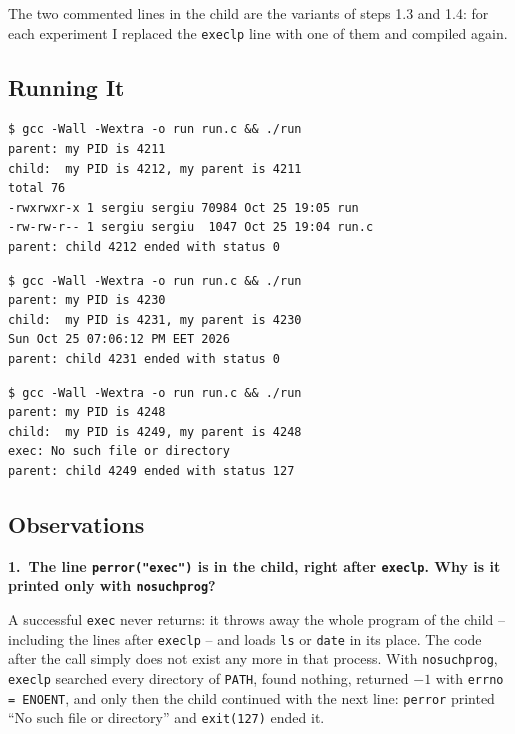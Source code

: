 \documentclass[12pt,a4paper]{article}
\newcommand{\qa}[2]{%
  \par\needspace{5\baselineskip}\medskip
  \noindent\textbf{#1.~#2}\par\smallskip\noindent}
\begin{document}
The two commented lines in the child are the variants of steps 1.3 and 1.4: for each experiment I replaced the \texttt{execlp} line with one of them and compiled again.

\subsection{Running It}

\begin{lstlisting}[style=terminal,caption={Step 1.2: the child becomes ls -l}]
$ gcc -Wall -Wextra -o run run.c && ./run
parent: my PID is 4211
child:  my PID is 4212, my parent is 4211
total 76
-rwxrwxr-x 1 sergiu sergiu 70984 Oct 25 19:05 run
-rw-rw-r-- 1 sergiu sergiu  1047 Oct 25 19:04 run.c
parent: child 4212 ended with status 0
\end{lstlisting}

\begin{lstlisting}[style=terminal,caption={Step 1.3: the child becomes date}]
$ gcc -Wall -Wextra -o run run.c && ./run
parent: my PID is 4230
child:  my PID is 4231, my parent is 4230
Sun Oct 25 07:06:12 PM EET 2026
parent: child 4231 ended with status 0
\end{lstlisting}

\begin{lstlisting}[style=terminal,caption={Step 1.4: a program that does not exist}]
$ gcc -Wall -Wextra -o run run.c && ./run
parent: my PID is 4248
child:  my PID is 4249, my parent is 4248
exec: No such file or directory
parent: child 4249 ended with status 127
\end{lstlisting}

\subsection*{Observations}

\qa{1}{The line \texttt{perror("exec")} is in the child, right after \texttt{execlp}. Why is it printed only with \texttt{nosuchprog}?}
A successful \texttt{exec} never returns: it throws away the whole program of the child -- including the lines after \texttt{execlp} -- and loads \texttt{ls} or \texttt{date} in its place. The code after the call simply does not exist any more in that process. With \texttt{nosuchprog}, \texttt{execlp} searched every directory of \texttt{PATH}, found nothing, returned $-1$ with \texttt{errno = ENOENT}, and only then the child continued with the next line: \texttt{perror} printed ``No such file or directory'' and \texttt{exit(127)} ended it.
\end{document}

